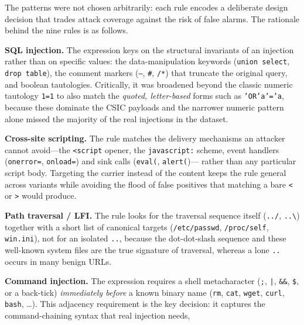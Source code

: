 \documentclass[../main.tex]{subfiles}
\begin{document}
The patterns were not chosen arbitrarily: each rule encodes a deliberate
design decision that trades attack coverage against the risk of false alarms.
The rationale behind the nine rules is as follows.

\begin{romanlist}
  \item \textbf{SQL injection.} The expression keys on the structural
        invariants of an injection rather than on specific values: the
        data-manipulation keywords (\texttt{union select}, \texttt{drop table}),
        the comment markers (\texttt{--}, \texttt{\#}, \texttt{/*}) that
        truncate the original query, and boolean tautologies. Critically, it
        was broadened beyond the classic numeric tautology \texttt{1=1} to also
        match the \emph{quoted, letter-based} forms such as \texttt{'OR'a'='a},
        because these dominate the CSIC payloads and the narrower numeric
        pattern alone missed the majority of the real injections in the
        dataset.
  \item \textbf{Cross-site scripting.} The rule matches the delivery
        mechanisms an attacker cannot avoid---the \texttt{<script} opener, the
        \texttt{javascript:} scheme, event handlers (\texttt{onerror=},
        \texttt{onload=}) and sink calls (\texttt{eval(}, \texttt{alert(})---
        rather than any particular script body. Targeting the carrier instead
        of the content keeps the rule general across variants while avoiding
        the flood of false positives that matching a bare \texttt{<} or
        \texttt{>} would produce.
  \item \textbf{Path traversal / LFI.} The rule looks for the traversal
        sequence itself (\texttt{../}, \texttt{..\textbackslash}) together with
        a short list of canonical targets (\texttt{/etc/passwd},
        \texttt{/proc/self}, \texttt{win.ini}), not for an isolated
        \texttt{..}, because the dot-dot-slash sequence and these well-known
        system files are the true signature of traversal, whereas a lone
        \texttt{..} occurs in many benign URLs.
  \item \textbf{Command injection.} The expression requires a shell
        metacharacter (\texttt{;}, \texttt{|}, \texttt{\&\&}, \texttt{\$}, or a
        back-tick) \emph{immediately before} a known binary name
        (\texttt{rm}, \texttt{cat}, \texttt{wget}, \texttt{curl},
        \texttt{bash}, \dots). This adjacency requirement is the key decision:
        it captures the command-chaining syntax that real injection needs,

\end{romanlist}
\end{document}
